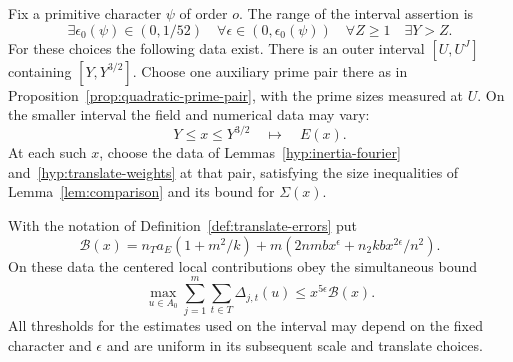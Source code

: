 \begin{windowtheorem}\label{hyp:uniform-arithmetic-data}
Fix a primitive character \(\psi\) of order \(o\). The range of the interval assertion is
\[
 \exists\epsilon_0(\psi)\in(0,1/52)\quad
 \forall\epsilon\in(0,\epsilon_0(\psi))\quad
 \forall Z\ge1\quad\exists Y>Z .
\]
For these choices the following data exist. There is an outer interval \([U,U^J]\) containing \([Y,Y^{3/2}]\). Choose one auxiliary prime pair there as in Proposition~\ref{prop:quadratic-prime-pair}, with the prime sizes measured at \(U\). On the smaller interval the field and numerical data may vary:
\[
                  Y\le x\le Y^{3/2}\quad\longmapsto\quad E(x).
\]
At each such \(x\), choose the data of Lemmas~\ref{hyp:inertia-fourier} and~\ref{hyp:translate-weights} at that pair, satisfying the size inequalities of Lemma~\ref{lem:comparison} and its bound for \(\Sigma(x)\).

With the notation of Definition~\ref{def:translate-errors} put
\[
 \mathcal B(x)=n_Ta_E(1+m^2/k)
       +m\left(2nmbx^\epsilon+n_2kb x^{2\epsilon}/n^2\right).
\]
On these data the centered local contributions obey the simultaneous bound
\begin{equation}\label{eq:uniform-raw-gap}
 \max_{u\in A_0}\sum_{j=1}^{m}\sum_{t\in T}\Delta_{j,t}(u)
       \le x^{5\epsilon}\mathcal B(x).
\end{equation}
All thresholds for the estimates used on the interval may depend on the fixed character and \(\epsilon\) and are uniform in its subsequent scale and translate choices.
\end{windowtheorem}

